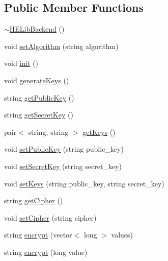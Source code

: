 \subsection*{Public Member Functions}
\begin{DoxyCompactItemize}
\item 
\mbox{\hyperlink{classhomomorphine_1_1_h_e_lib_backend_a1ef98efe05281fefbe6d044dc474017a}{$\sim$\+H\+E\+Lib\+Backend}} ()
\item 
void \mbox{\hyperlink{classhomomorphine_1_1_h_e_lib_backend_a39478377b0e299fd90f5c7bb6c8efe89}{set\+Algorithm}} (string algorithm)
\item 
void \mbox{\hyperlink{classhomomorphine_1_1_h_e_lib_backend_a6a7e7c8095f2287c41f7d93be91418ec}{init}} ()
\item 
void \mbox{\hyperlink{classhomomorphine_1_1_h_e_lib_backend_a2c6ed82eeb597b99ae6cdb2734412a0f}{generate\+Keys}} ()
\item 
string \mbox{\hyperlink{classhomomorphine_1_1_h_e_lib_backend_a8b096d4780f3b65f0fa0cb3ca6cb9ab8}{get\+Public\+Key}} ()
\item 
string \mbox{\hyperlink{classhomomorphine_1_1_h_e_lib_backend_a57af39a901a44fef6aad76503739fde4}{get\+Secret\+Key}} ()
\item 
pair$<$ string, string $>$ \mbox{\hyperlink{classhomomorphine_1_1_h_e_lib_backend_ab45838cc01a4e71425e2aa0279e12c0e}{get\+Keys}} ()
\item 
void \mbox{\hyperlink{classhomomorphine_1_1_h_e_lib_backend_af54dc3990d99aab69c97172d0e5b4e51}{set\+Public\+Key}} (string public\+\_\+key)
\item 
void \mbox{\hyperlink{classhomomorphine_1_1_h_e_lib_backend_a483a6695be2d733d48e2180ffb25d053}{set\+Secret\+Key}} (string secret\+\_\+key)
\item 
void \mbox{\hyperlink{classhomomorphine_1_1_h_e_lib_backend_a2980c8eaf3556057aac364a1e61ab8cd}{set\+Keys}} (string public\+\_\+key, string secret\+\_\+key)
\item 
string \mbox{\hyperlink{classhomomorphine_1_1_h_e_lib_backend_a9ba4311289e3b8c47f389f4f44de7d5d}{get\+Cipher}} ()
\item 
void \mbox{\hyperlink{classhomomorphine_1_1_h_e_lib_backend_a5baa6ad05fbb23d27c4ec4bb018a8c64}{set\+Cipher}} (string cipher)
\item 
string \mbox{\hyperlink{classhomomorphine_1_1_h_e_lib_backend_af030a10bdd905f7cccf72c8eabfefdd7}{encrypt}} (vector$<$ long $>$ values)
\item 
string \mbox{\hyperlink{classhomomorphine_1_1_h_e_lib_backend_a6a958824a123eab41b2099dbc001dc13}{encrypt}} (long value)

\end{DoxyCompactItemize}
